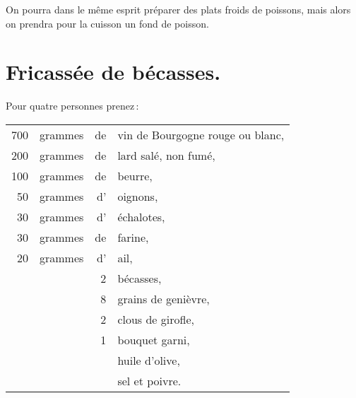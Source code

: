 \sk

On pourra dans le même esprit préparer des plats froids de poissons, mais alors
on prendra pour la cuisson un fond de poisson.

\section*{\centering Fricassée de bécasses.}
{}

Pour quatre personnes prenez :

\footnotesize
\begin{longtable}{rrrp{16em}}
    700 & grammes & de & vin de Bourgogne rouge ou blanc,                                                 \\
    200 & grammes & de & lard salé, non fumé,                                                             \\
    100 & grammes & de & beurre,                                                                          \\
     50 & grammes & d' & oignons,                                                                         \\
     30 & grammes & d' & échalotes,                                                                       \\
     30 & grammes & de & farine,                                                                          \\
     20 & grammes & d’ & ail,                                                                             \\
        &         &  2 & bécasses,                                                                        \\
        &         &  8 & grains de genièvre,                                                              \\
        &         &  2 & clous de girofle,                                                                \\
        &         &  1 & bouquet garni,                                                                   \\
        &         &    & huile d'olive,                                                                   \\
        &         &    & sel et poivre.                                                                   \\
\end{longtable}
\normalsize

